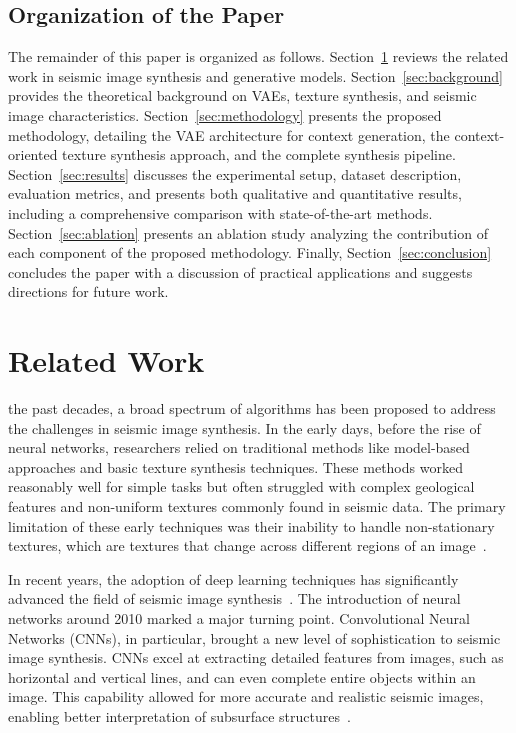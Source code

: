 \documentclass{ieeeaccess}
\begin{document}
\subsection{Organization of the Paper}
The remainder of this paper is organized as follows. Section~\ref{sec:related} reviews the related work in seismic image synthesis and generative models. Section~\ref{sec:background} provides the theoretical background on VAEs, texture synthesis, and seismic image characteristics. Section~\ref{sec:methodology} presents the proposed methodology, detailing the VAE architecture for context generation, the context-oriented texture synthesis approach, and the complete synthesis pipeline. Section~\ref{sec:results} discusses the experimental setup, dataset description, evaluation metrics, and presents both qualitative and quantitative results, including a comprehensive comparison with state-of-the-art methods. Section~\ref{sec:ablation} presents an ablation study analyzing the contribution of each component of the proposed methodology. Finally, Section~\ref{sec:conclusion} concludes the paper with a discussion of practical applications and suggests directions for future work.

\section{Related Work}
\label{sec:related}

 the past decades, a broad spectrum of algorithms has been proposed to address the challenges in seismic image synthesis. In the early days, before the rise of neural networks, researchers relied on traditional methods like model-based approaches and basic texture synthesis techniques. These methods worked reasonably well for simple tasks but often struggled with complex geological features and non-uniform textures commonly found in seismic data. The primary limitation of these early techniques was their inability to handle non-stationary textures, which are textures that change across different regions of an image~\cite{Zhou2018}.

In recent years, the adoption of deep learning techniques has significantly advanced the field of seismic image synthesis~\cite{Zeng2019}. The introduction of neural networks around 2010 marked a major turning point. Convolutional Neural Networks (CNNs), in particular, brought a new level of sophistication to seismic image synthesis. CNNs excel at extracting detailed features from images, such as horizontal and vertical lines, and can even complete entire objects within an image. This capability allowed for more accurate and realistic seismic images, enabling better interpretation of subsurface structures~\cite{Powers2011}. 
\end{document}
